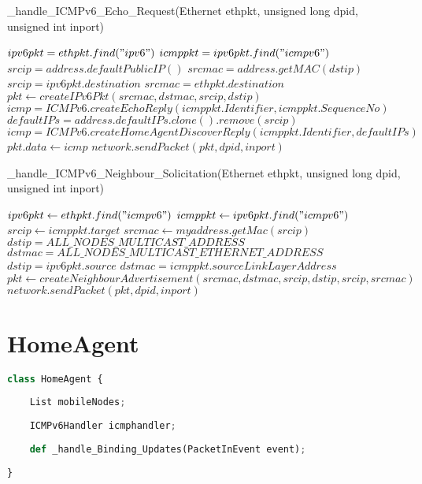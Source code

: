 \documentclass[10pt,a4paper,titlepage]{report}
\begin{document}
		\begin{algorithm}
			\caption{\_handle\_ICMPv6\_Echo\_Request(Ethernet ethpkt, unsigned long dpid, unsigned int inport)}
			\begin{algorithmic}[1]
				\STATE $ipv6pkt = ethpkt.find("ipv6")$
				\STATE $icmppkt = ipv6pkt.find("icmpv6")$
					\STATE $srcip = address.defaultPublicIP()$
					\STATE $srcmac = address.getMAC(dstip)$
				\ELSE
					\STATE $srcip = ipv6pkt.destination$
					\STATE $srcmac = ethpkt.destination$
				\ENDIF
				\STATE $pkt \leftarrow createIPv6Pkt(srcmac, dstmac, srcip, dstip)$
					\STATE $icmp = ICMPv6.createEchoReply(icmppkt.Identifier, icmppkt.SequenceNo)$
					\STATE $defaultIPs = address.defaultIPs.clone().remove(srcip)$
					\STATE $icmp = ICMPv6.createHomeAgentDiscoverReply(icmppkt.Identifier, defaultIPs)$
				\ENDIF
				\STATE $pkt.data \leftarrow icmp$
				\STATE $network.sendPacket(pkt, dpid, inport)$
			\end{algorithmic}
		\end{algorithm}
		
		\begin{algorithm}
			\caption{\_handle\_ICMPv6\_Neighbour\_Solicitation(Ethernet ethpkt, unsigned long dpid, unsigned int inport)}
			\begin{algorithmic}[1]
				\STATE $ipv6pkt \leftarrow ethpkt.find("icmpv6")$
				\STATE $icmppkt \leftarrow ipv6pkt.find("icmpv6")$
				\STATE $srcip \leftarrow icmppkt.target$
				\STATE $srcmac \leftarrow myaddress.getMac(srcip)$
				\IF {$ipv6pkt.source\ \textbf{is}\ \textbf{UNSPECIFIED}$}
					\STATE $dstip = ALL\_NODES\_MULTICAST\_ADDRESS$
					\STATE $dstmac = ALL\_NODES\_MULTICAST\_ETHERNET\_ADDRESS$
				\ELSE
					\STATE $dstip = ipv6pkt.source$
					\STATE $dstmac = icmppkt.sourceLinkLayerAddress$
				\ENDIF
				\STATE $pkt \leftarrow createNeighbourAdvertisement(srcmac, dstmac, srcip, dstip, srcip, srcmac)$
				\STATE $network.sendPacket(pkt, dpid, inport)$
			\end{algorithmic}
		\end{algorithm}
	
	\section{HomeAgent}
		\begin{lstlisting}[language=Python]
class HomeAgent {
	
	List mobileNodes;
	
	ICMPv6Handler icmphandler;
	
	def _handle_Binding_Updates(PacketInEvent event);
	
}
		\end{lstlisting}
		
\end{document}
